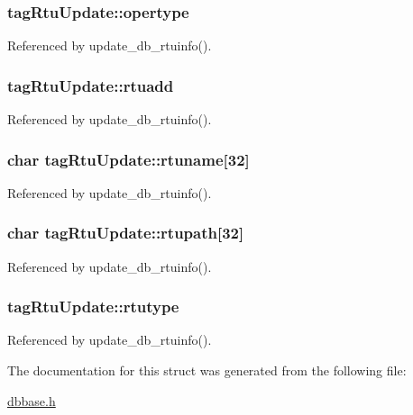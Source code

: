 \hypertarget{structtagRtuUpdate_a18f45ebb99af23a679baff3f74dc5a03}{
\subsubsection[{opertype}]{ tag\-Rtu\-Update\-::opertype}}\label{structtagRtuUpdate_a18f45ebb99af23a679baff3f74dc5a03}


Referenced by update\-\_\-db\-\_\-rtuinfo().

\hypertarget{structtagRtuUpdate_a46b499cc1e9cc261bc55569584d4ccf8}{
\subsubsection[{rtuadd}]{ tag\-Rtu\-Update\-::rtuadd}}\label{structtagRtuUpdate_a46b499cc1e9cc261bc55569584d4ccf8}


Referenced by update\-\_\-db\-\_\-rtuinfo().

\hypertarget{structtagRtuUpdate_ad59c19c96225b0c2d613a242ae4ba2fa}{
\subsubsection[{rtuname}]{\setlength{\rightskip}{0pt plus 5cm}char tag\-Rtu\-Update\-::rtuname\mbox{[}32\mbox{]}}}\label{structtagRtuUpdate_ad59c19c96225b0c2d613a242ae4ba2fa}


Referenced by update\-\_\-db\-\_\-rtuinfo().

\hypertarget{structtagRtuUpdate_afd323191d1f18ed84f2599242daf5790}{
\subsubsection[{rtupath}]{\setlength{\rightskip}{0pt plus 5cm}char tag\-Rtu\-Update\-::rtupath\mbox{[}32\mbox{]}}}\label{structtagRtuUpdate_afd323191d1f18ed84f2599242daf5790}


Referenced by update\-\_\-db\-\_\-rtuinfo().

\hypertarget{structtagRtuUpdate_a660c0c4c633a277e1ea754f2a070140d}{
\subsubsection[{rtutype}]{ tag\-Rtu\-Update\-::rtutype}}\label{structtagRtuUpdate_a660c0c4c633a277e1ea754f2a070140d}


Referenced by update\-\_\-db\-\_\-rtuinfo().



The documentation for this struct was generated from the following file\-:\begin{DoxyCompactItemize}
\item 
\hyperlink{dbbase_8h}{dbbase.\-h}\end{DoxyCompactItemize}

